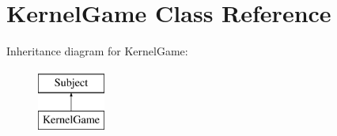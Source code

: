 \hypertarget{class_kernel_game}{\section{Kernel\-Game Class Reference}
\label{class_kernel_game}
}
Inheritance diagram for Kernel\-Game\-:\begin{figure}[H]
\begin{center}
\leavevmode
\includegraphics[height=2.000000cm]{class_kernel_game}
\end{center}
\end{figure}
